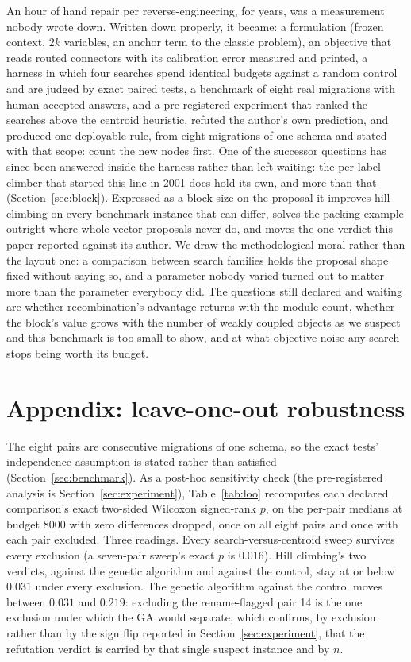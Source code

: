 \documentclass[11pt]{article}
\begin{document}
An hour of hand repair per reverse-engineering, for years, was a measurement nobody wrote
down. Written down properly, it became: a formulation (frozen context, $2k$ variables, an
anchor term to the classic problem), an objective that reads routed connectors with its
calibration error measured and printed, a harness in which four searches spend identical
budgets against a random control and are judged by exact paired tests, a benchmark of
eight real migrations with human-accepted answers, and a pre-registered experiment that
ranked the searches above the centroid heuristic, refuted the author's own prediction, and
produced one deployable rule, from eight migrations of one schema and stated with that
scope: count the new nodes first. One of the successor questions has since been answered
inside the harness rather than left waiting: the per-label climber that started this line in
2001 does hold its own, and more than that (Section~\ref{sec:block}). Expressed as a block
size on the proposal it improves hill climbing on every benchmark instance that can differ,
solves the packing example outright where whole-vector proposals never do, and moves the one
verdict this paper reported against its author. We draw the methodological moral rather than
the layout one: a comparison between search families holds the proposal shape fixed without
saying so, and a parameter nobody varied turned out to matter more than the parameter
everybody did. The questions still declared and waiting are whether recombination's advantage
returns with the module count, whether the block's value grows with the number of weakly
coupled objects as we suspect and this benchmark is too small to show, and at what objective
noise any search stops being worth its budget.

\section*{Appendix: leave-one-out robustness}

The eight pairs are consecutive migrations of one schema, so the exact tests'
independence assumption is stated rather than satisfied
(Section~\ref{sec:benchmark}). As a post-hoc sensitivity check (the pre-registered
analysis is Section~\ref{sec:experiment}), Table~\ref{tab:loo} recomputes each declared
comparison's exact two-sided Wilcoxon signed-rank $p$, on the per-pair medians at budget
8000 with zero differences dropped, once on all eight pairs and once with each pair
excluded. Three readings. Every search-versus-centroid sweep survives every exclusion
(a seven-pair sweep's exact $p$ is $0.016$). Hill climbing's two verdicts, against the
genetic algorithm and against the control, stay at or below $0.031$ under every
exclusion. The genetic algorithm against the control moves between $0.031$ and $0.219$:
excluding the rename-flagged pair 14 is the one exclusion under which the GA would
separate, which confirms, by exclusion rather than by the sign flip reported in
Section~\ref{sec:experiment}, that the refutation verdict is carried by that single
suspect instance and by $n$.
\end{document}
